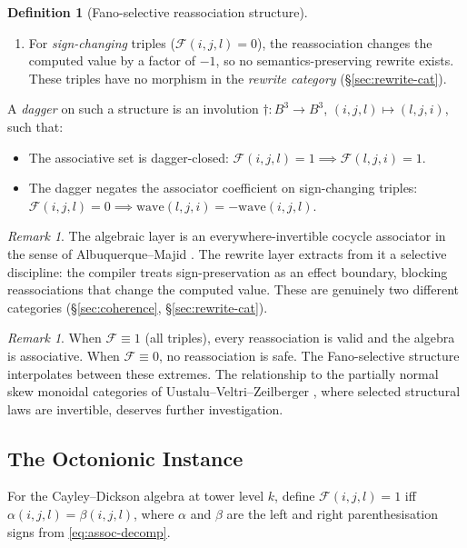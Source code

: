\documentclass[11pt,a4paper]{article}
\theoremstyle{definition}
\newtheorem{definition}[theorem]{Definition}
\theoremstyle{remark}
\newtheorem{remark}[theorem]{Remark}
\newcommand{\Fano}{\mathcal{F}}
\newcommand{\wave}{\mathrm{wave}}
\newcommand{\dagop}{{\dagger}}
\begin{document}
\begin{definition}[Fano-selective reassociation structure]
\begin{enumerate}
\item For \emph{sign-changing} triples ($\Fano(i,j,l) = 0$), the
  reassociation changes the computed value by a factor of $-1$, so
  no semantics-preserving rewrite exists. These triples have no
  morphism in the \emph{rewrite category} (\S\ref{sec:rewrite-cat}).
\end{enumerate}

A \emph{dagger} on such a structure is an involution
$\dagop: B^3 \to B^3$, $(i,j,l) \mapsto (l,j,i)$, such that:
\begin{itemize}
\item The associative set is dagger-closed:
  $\Fano(i,j,l) = 1 \implies \Fano(l,j,i) = 1$.
\item The dagger negates the associator coefficient on sign-changing
  triples: $\Fano(i,j,l) = 0 \implies \wave(l,j,i) = -\wave(i,j,l)$.
\end{itemize}
\end{definition}

\begin{remark}
The algebraic layer is an everywhere-invertible cocycle associator
in the sense of Albuquerque--Majid \cite{albuquerque1999}. The
rewrite layer extracts from it a selective discipline: the compiler
treats sign-preservation as an effect boundary, blocking
reassociations that change the computed value. These are genuinely
two different categories (\S\ref{sec:coherence},
\S\ref{sec:rewrite-cat}).
\end{remark}

\begin{remark}
When $\Fano \equiv 1$ (all triples), every reassociation is valid and
the algebra is associative. When $\Fano \equiv 0$, no reassociation is
safe. The Fano-selective structure interpolates between these extremes.
The relationship to the partially normal skew monoidal categories
of Uustalu--Veltri--Zeilberger \cite{uvz2021}, where selected
structural laws are invertible, deserves further investigation.
\end{remark}

\subsection{The Octonionic Instance}

For the Cayley--Dickson algebra at tower level $k$, define
$\Fano(i,j,l) = 1$ iff $\alpha(i,j,l) = \beta(i,j,l)$, where
$\alpha$ and $\beta$ are the left and right parenthesisation signs
from \eqref{eq:assoc-decomp}.
\end{document}
